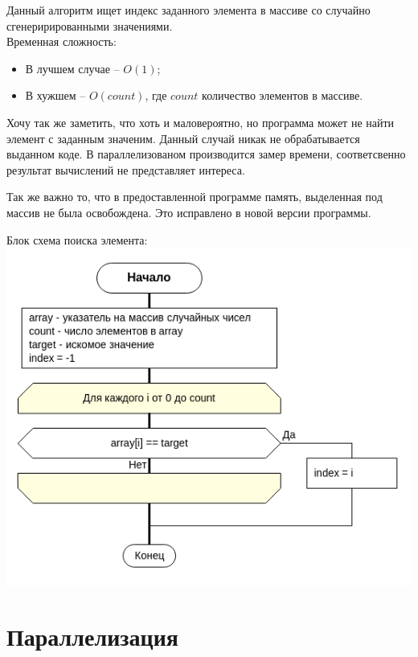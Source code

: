 \documentclass[a4paper, 12pt]{article}
\begin{document}
Данный алгоритм ищет индекс заданного элемента в массиве со случайно сгенерирированными значениями.\\
Временная сложность:
\begin{itemize}
 \item В лучшем случае -- $O(1)$;
 \item В хужшем -- $O(count)$, где $count$ количество элементов в массиве.
\end{itemize}

Хочу так же заметить, что хоть и маловероятно, но программа может не найти элемент с заданным значеним. Данный случай никак не обрабатывается выданном коде. В параллелизованом производится замер времени, соответсвенно результат вычислений не представляет интереса.

Так же важно то, что в предоставленной программе память, выделенная под массив не была освобождена. Это исправлено в новой версии программы.

\vspace{0.5cm}

Блок схема поиска элемента:\\
\includegraphics[scale=0.6]{res/original.png}



\section{Параллелизация}
\end{document}
